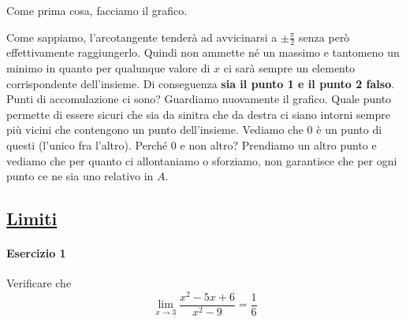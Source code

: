 Come prima cosa, facciamo il grafico.
\begin{center}
\end{center}
Come sappiamo, l'arcotangente tenderà ad avvicinarsi a $\pm\frac{\pi}{2}$ senza però effettivamente
raggiungerlo. Quindi non ammette né un massimo e tantomeno un minimo in quanto per qualunque valore
di $x$ ci sarà sempre un elemento corrispondente dell'insieme. Di conseguenza \textbf{sia il punto 1 
e il punto 2 falso}.\\
Punti di accomulazione ci sono? Guardiamo nuovamente il grafico. Quale punto permette di essere
sicuri che sia da sinitra che da destra ci siano intorni sempre più vicini che contengono un punto
dell'insieme. Vediamo che $0$ è un punto di questi (l'unico fra l'altro). Perché $0$ e non altro?
Prendiamo un altro punto e vediamo che per quanto ci allontaniamo o sforziamo, non garantisce che 
per	ogni punto ce ne sia uno relativo in $A$.

\subsection*{\hyperref[sec:limiti]{Limiti}}\label{ex:limiti}
\paragraph{Esercizio 1}
Verificare che
\begin{equation*}
  \lim\limits_{x\to3}\frac{x^2-5x+6}{x^2-9}=\frac{1}{6}
\end{equation*}
\divisor

